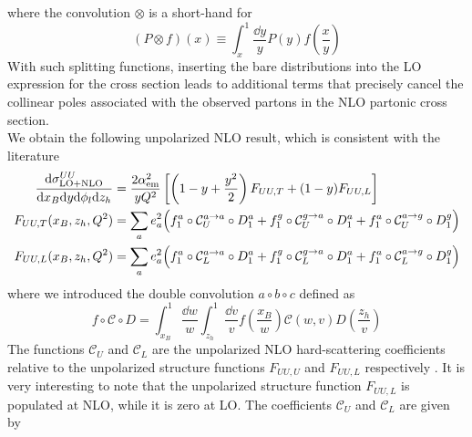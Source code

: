 where the convolution $\otimes$ is a short-hand for
\begin{equation}
    (P\otimes f )(x)\equiv\int_x^1\frac{\dd y}{y} P(y) f\left(\frac{x}{y}\right)
\end{equation}
With such splitting functions, inserting the bare distributions into the LO expression for the cross section leads to additional terms that precisely cancel the collinear poles associated with the observed partons in the NLO partonic cross section. \\
We obtain the following unpolarized NLO result, which is consistent with the literature \cite{de_Florian_1998}
\begin{equation}
    \begin{aligned}
        \frac{\dd \sigma^{UU}_{\rm LO+NLO}}{\dd x_B \dd y \dd \phi_l \dd z_h}&=\frac{2 \alpha_{\rm em}^2}{y  Q^2}\left[ \left(1-y+\frac{y^2}{2}\right)F_{UU,T} +(1-y)F_{UU,L}\right]\\
        F_{UU,T}(x_B,z_h,Q^2)&= \sum_a e_a^2 \Big(f_1^a \circ \mathcal{C}_U^{a \to a} \circ D_1^a +f_1^g \circ \mathcal{C}_{U}^{g \to a} \circ D_1^a+f_1^a \circ \mathcal{C}_U^{a \to g} \circ D_1^g \Big)\\
        F_{UU,L}(x_B,z_h,Q^2)&=\sum_a e_a^2 \Big(f_1^a \circ \mathcal{C}_L^{a \to a} \circ D_1^a  +f_1^g \circ \mathcal{C}_L^{g \to a} \circ D_1^a+f_1^a \circ \mathcal{C}_L^{a \to g} \circ D_1^g \Big)
    \end{aligned}
\end{equation}
where we introduced the double convolution $a\circ b\circ c$ defined as
\begin{equation}
    f \circ \mathcal{C} \circ D = \int_{x_B}^1 \frac{\dd w}{w}\int_{z_h}^1 \frac{\dd v}{v} f\left(\frac{x_B}{w}\right) \mathcal{C}\left(w,v\right) D\left(\frac{z_h}{v}\right)
\end{equation}
The functions $\mathcal{C}_U$ and $\mathcal{C}_L$ are the unpolarized NLO hard-scattering coefficients relative to the unpolarized structure functions $F_{UU,U}$ and $F_{UU,L}$ respectively \cite{bacchetta_semi-inclusive_2007}. It is very interesting to note that the unpolarized structure function $F_{UU,L}$ is populated at NLO, while it is zero at LO. The coefficients $\mathcal{C}_U$ and $\mathcal{C}_L$ are given by
